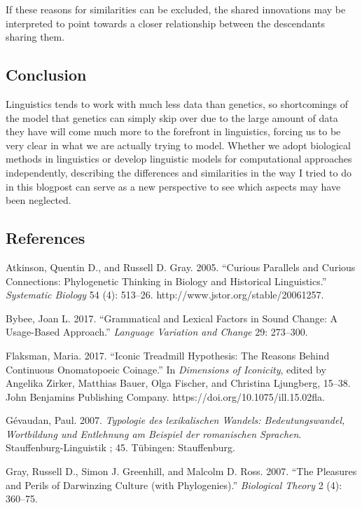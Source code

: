 \documentclass[
  a4paper,
  14pt,
  oneside,
  tablecaptionabove
]{scrbook}
\begin{document}
If these reasons for similarities can be excluded, the shared innovations may be interpreted to point towards a closer relationship between the descendants sharing them.

\subsection*{Conclusion}

Linguistics tends to work with much less data than genetics, so shortcomings of the model that genetics can simply skip over due to the large amount of data they have will come much more to the forefront in linguistics, forcing us to be very clear in what we are actually trying to model. Whether we adopt biological methods in linguistics or develop linguistic models for computational approaches independently, describing the differences and similarities in the way I tried to do in this blogpost can serve as a new perspective to see which aspects may have been neglected.

\subsection*{References}


\nopagebreak\hangindent=0.7cm {\small Atkinson, Quentin D., and Russell D. Gray. 2005.
\enquote{Curious Parallels and Curious Connections: Phylogenetic Thinking in Biology and Historical Linguistics.}
\emph{Systematic Biology} 54 (4): 513–26. http://www.jstor.org/stable/20061257.}

\nopagebreak\hangindent=0.7cm {\small  Bybee, Joan L. 2017.
\enquote{Grammatical and Lexical Factors in Sound Change: A Usage-Based Approach.}
\emph{Language Variation and Change} 29: 273–300.}

\nopagebreak\hangindent=0.7cm {\small  Flaksman, Maria. 2017.
\enquote{Iconic Treadmill Hypothesis: The Reasons Behind Continuous Onomatopoeic Coinage.} In
\emph{Dimensions of Iconicity}, edited by Angelika Zirker, Matthias Bauer, Olga Fischer, and Christina Ljungberg, 15–38. John Benjamins Publishing Company. https://doi.org/10.1075/ill.15.02fla.}

\nopagebreak\hangindent=0.7cm {\small  Gévaudan, Paul. 2007.
\emph{Typologie des lexikalischen Wandels: Bedeutungswandel, Wortbildung und Entlehnung am Beispiel der romanischen Sprachen}. Stauffenburg-Linguistik ; 45. Tübingen: Stauffenburg.}

\nopagebreak\hangindent=0.7cm {\small  Gray, Russell D., Simon J. Greenhill, and Malcolm D. Ross. 2007.
\enquote{The Pleasures and Perils of Darwinzing Culture (with Phylogenies).}
\emph{Biological Theory} 2 (4): 360–75.}
\end{document}
